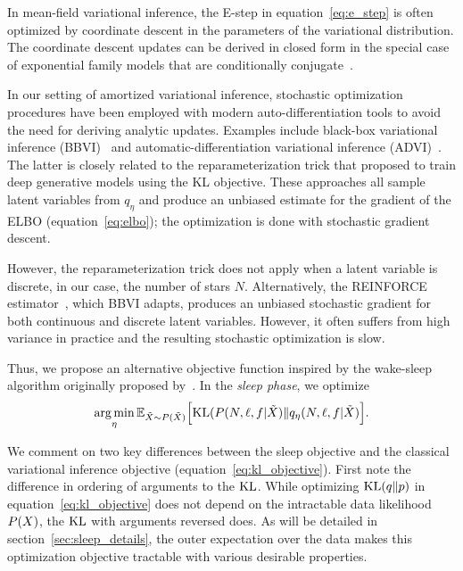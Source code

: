 In mean-field variational inference, the E-step in equation~\eqref{eq:e_step} is often optimized by coordinate descent in the parameters of the variational distribution. 
The coordinate descent updates can be derived in closed form in the special case of exponential family models that are conditionally conjugate~\cite{Blei_2017_vi_review}. 

In our setting of amortized variational inference, stochastic 
optimization procedures have been employed with modern 
auto-differentiation tools to avoid the need for deriving 
analytic updates. Examples include black-box variational inference (BBVI)~\cite{ranganath2013black} 
and automatic-differentiation variational inference (ADVI)~\cite{kucukelbir2016automatic}. The latter 
is closely related to the reparameterization trick that \cite{kingma2013autoencoding, rezende2014stochastic} proposed to train deep generative models using the KL objective. 
These approaches all sample latent variables from $q_\eta$ and produce an unbiased estimate 
for the gradient of the ELBO (equation~\eqref{eq:elbo}); the optimization is done with stochastic gradient descent. 

However, the reparameterization trick does not apply when a latent variable is discrete, in our case, the number of stars $N$. Alternatively, the REINFORCE estimator~\cite{Williams1992reinforce}, which BBVI adapts, produces an unbiased stochastic gradient for both continuous and discrete latent variables. However, it often suffers from high variance in practice and the resulting stochastic optimization is slow. 

Thus, we propose an alternative objective function inspired by 
the wake-sleep algorithm originally proposed by~\cite{Hinton1995wake_sleep}. 
In the {\itshape sleep phase}, we optimize  
\begin{align}
    \operatorname*{arg\,min}_{\eta} \mathbb{E}_{\tilde X \sim P(\tilde X)}\Big[\textrm{KL}(P(N, \ell, f | \tilde X) \| q_\eta(N, \ell, f | \tilde X)\Big]. 
    \label{eq:sleep_obj}
\end{align}

We comment on two key differences between the sleep objective and the classical variational inference objective (equation~\ref{eq:kl_objective}). First note the difference in ordering of arguments to the $\textrm{KL}$. 
While optimizing $\textrm{KL}(q\|p)$ in equation~\eqref{eq:kl_objective} does not depend on the intractable 
data likelihood $P(X)$, the $\textrm{KL}$ with arguments reversed does. 
As will be detailed in section~\ref{sec:sleep_details}, the outer expectation over the data makes this optimization objective tractable with various desirable properties. 

